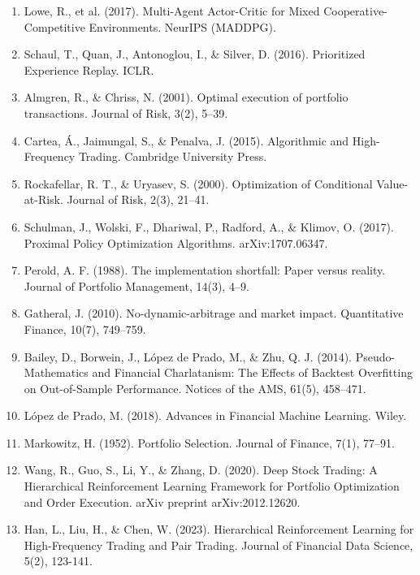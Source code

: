 \documentclass[11pt,a4paper]{article}
\begin{document}
\begin{enumerate}
\item Lowe, R., et al. (2017). Multi-Agent Actor-Critic for Mixed Cooperative-Competitive Environments. NeurIPS (MADDPG).

\item Schaul, T., Quan, J., Antonoglou, I., \& Silver, D. (2016). Prioritized Experience Replay. ICLR.

\item Almgren, R., \& Chriss, N. (2001). Optimal execution of portfolio transactions. Journal of Risk, 3(2), 5–39.

\item Cartea, Á., Jaimungal, S., \& Penalva, J. (2015). Algorithmic and High-Frequency Trading. Cambridge University Press.

\item Rockafellar, R. T., \& Uryasev, S. (2000). Optimization of Conditional Value-at-Risk. Journal of Risk, 2(3), 21–41.

\item Schulman, J., Wolski, F., Dhariwal, P., Radford, A., \& Klimov, O. (2017). Proximal Policy Optimization Algorithms. arXiv:1707.06347.

\item Perold, A. F. (1988). The implementation shortfall: Paper versus reality. Journal of Portfolio Management, 14(3), 4–9.

\item Gatheral, J. (2010). No-dynamic-arbitrage and market impact. Quantitative Finance, 10(7), 749–759.

\item Bailey, D., Borwein, J., López de Prado, M., \& Zhu, Q. J. (2014). Pseudo-Mathematics and Financial Charlatanism: The Effects of Backtest Overfitting on Out-of-Sample Performance. Notices of the AMS, 61(5), 458–471.

\item López de Prado, M. (2018). Advances in Financial Machine Learning. Wiley.

\item Markowitz, H. (1952). Portfolio Selection. Journal of Finance, 7(1), 77–91.

\item Wang, R., Guo, S., Li, Y., \& Zhang, D. (2020). Deep Stock Trading: A Hierarchical Reinforcement Learning Framework for Portfolio Optimization and Order Execution. arXiv preprint arXiv:2012.12620.

\item Han, L., Liu, H., \& Chen, W. (2023). Hierarchical Reinforcement Learning for High-Frequency Trading and Pair Trading. Journal of Financial Data Science, 5(2), 123-141.


\end{enumerate}
\end{document}

